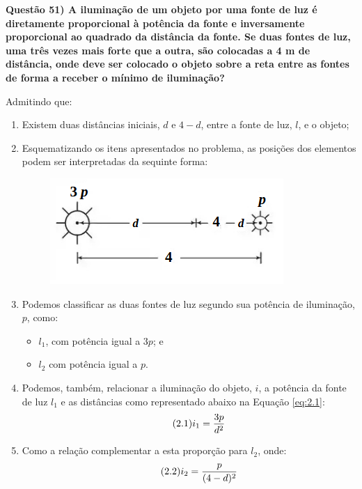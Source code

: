 \documentclass{article}
\begin{document}
\noindent \textbf{Questão 51) A iluminação de um objeto por uma fonte de luz é diretamente proporcional à potência da fonte e inversamente proporcional ao quadrado da distância da fonte. Se duas fontes de luz, uma três vezes mais forte que a outra, são colocadas a 4 m de distância, onde deve ser colocado o objeto sobre a reta entre as fontes de forma a receber o mínimo de iluminação?}\par
Admitindo que:
\begin{enumerate}[label=(\roman*)]
    \item Existem duas distâncias iniciais, $d$ e $4-d$, entre a fonte de luz, $l$, e o objeto;
    \item Esquematizando os itens apresentados no problema, as posições dos elementos podem ser interpretadas da sequinte forma:
          \begin{figure}[!h]
              \centering
              \includegraphics[scale=.85]{fig51.png}
          \end{figure}
    \item Podemos classificar as duas fontes de luz segundo sua potência de iluminação, $p$, como:
          \begin{itemize}
              \item[\ding{220}] $l_1$, com potência igual a $3p$; e %
              \item[\ding{220}] $l_2$ com potência igual a $p$.
          \end{itemize}
    \item Podemos, também, relacionar a iluminação do objeto, $i$, a potência da fonte de luz $l_1$ e as distâncias como representado abaixo na Equação \ref{eq:2.1}:
          \begin{equation}\tag{2.1}
              \label{eq:2.1}
              i_1 = {3p \over d^2}
          \end{equation}
    \item Como a relação complementar a esta proporção para $l_2$, onde:
          \begin{equation}\tag{2.2}
              \label{eq:2.2}
              i_2 = {p \over {(4-d)^2}}
          \end{equation}
\end{enumerate}
\end{document}

